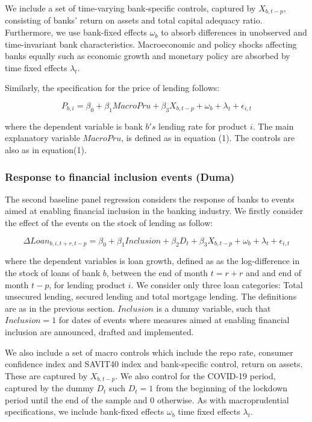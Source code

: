 \documentclass[
  letterpaper,
  DIV=11,
  numbers=noendperiod]{scrartcl}
\begin{document}
We include a set of time-varying bank-specific controls, captured by
\(X_{b,t-p}\), consisting of banks' return on assets and total capital
adequacy ratio. Furthermore, we use bank-fixed effects \(\omega_{b}\) to
absorb differences in unobserved and time-invariant bank
characteristics. Macroeconomic and policy shocks affecting banks equally
such as economic growth and monetary policy are absorbed by time fixed
effects \(\lambda_{t}\).

Similarly, the specification for the price of lending follows:

\begin{equation}
    P_{b,i}= \beta_{0}+\beta_{1}MacroPru +\beta_{3}X_{b,t-p}+ \omega_{b}+ \lambda_{t}+\epsilon_{i,t}
\end{equation}

where the dependent variable is bank \(b's\) lending rate for product
\(i\). The main explanatory variable \(MacroPru\), is defined as in
equation (1). The controls are also as in equation(1).

\subsubsection{Response to financial inclusion events
(Duma)}\label{response-to-financial-inclusion-events-duma}

The second baseline panel regression considers the response of banks to
events aimed at enabling financial inclusion in the banking industry. We
firstly consider the effect of the events on the stock of lending as
follow:

\begin{equation}
     \Delta Loan_{b,i,t+r,t-p}= \beta_{0}+\beta_{1}Inclusion+ \beta_{2}D_{t}+\beta_{3}X_{b,t-p}+ \omega_{b}+ \lambda_{t}+\epsilon_{i,t}
\end{equation}

where the dependent variables is loan growth, defined as as the
log-difference in the stock of loans of bank \(b\), between the end of
month \(t=r+r\) and and end of month \(t-p\), for lending product \(i\).
We consider only three loan categories: Total unsecured lending, secured
lending and total mortgage lending. The definitions are as in the
previous section. \(Inclusion\) is a dummy variable, such that
\(Inclusion=1\) for dates of events where measures aimed at enabling
financial inclusion are announced, drafted and implemented.

We also include a set of macro controls which include the repo rate,
consumer confidence index and SAVIT40 index and bank-specific control,
return on assets. These are captured by \(X_{b,t-p}\). We also control
for the COVID-19 period, captured by the dummy \(D_{t}\) such
\(D_{t}=1\) from the beginning of the lockdown period until the end of
the sample and \(0\) otherwise. As with macroprudential specifications,
we include bank-fixed effects \(\omega_{b}\) time fixed effects
\(\lambda_{t}\).
\end{document}
